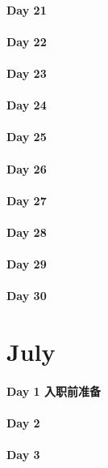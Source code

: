 \documentclass[UTF8,a4paper,8pt]{ctexart}
\begin{document}
 	 \paragraph{Day 21      \quad     }
 	 \paragraph{Day 22      \quad     }
 	 \paragraph{Day 23      \quad     }
 	 \paragraph{Day 24      \quad     }
 	 \paragraph{Day 25      \quad     }
 	 \paragraph{Day 26      \quad     }
 	 \paragraph{Day 27      \quad     }
 	 \paragraph{Day 28      \quad     }
 	 \paragraph{Day 29      \quad     }   
 	 \paragraph{Day 30      \quad     }
\section{July}
 	 \paragraph{Day 1   入职前准备    \quad     }
 	 \paragraph{Day 2       \quad     }
 	 \paragraph{Day 3       \quad     }
\end{document}
